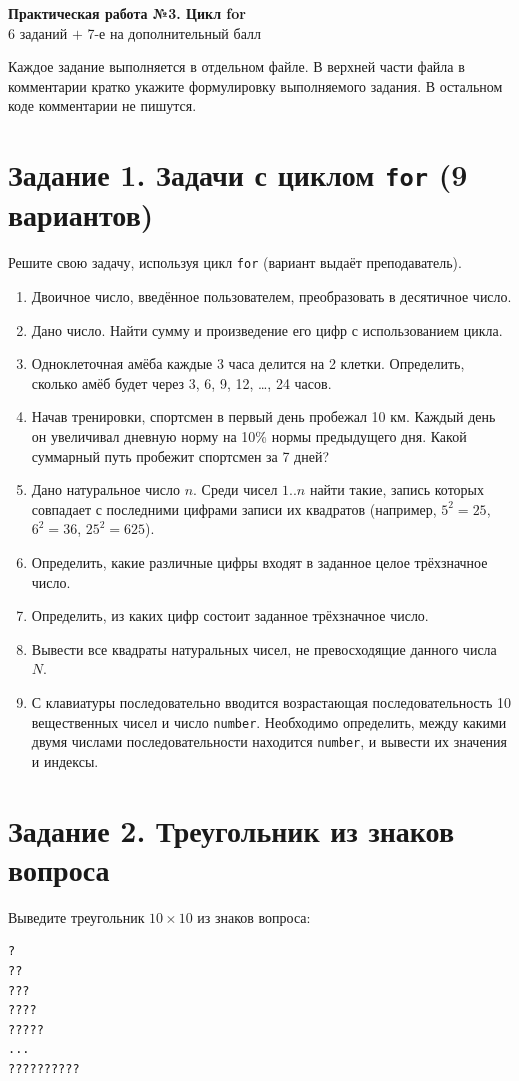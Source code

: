 \documentclass[a4paper,12pt]{article}
\begin{document}
\begin{center}
{\Large\bfseries Практическая работа №3. Цикл for}\\[4pt]
6 заданий $+$ 7-е на дополнительный балл
\end{center}

\medskip
Каждое задание выполняется в отдельном файле. В верхней части файла в комментарии
кратко укажите формулировку выполняемого задания. В остальном коде комментарии не пишутся.

\section*{Задание 1. Задачи с циклом \texttt{for} (9 вариантов)}
Решите свою задачу, используя цикл \texttt{for} (вариант выдаёт преподаватель).
\begin{enumerate}
  \item Двоичное число, введённое пользователем, преобразовать в десятичное число.
  \item Дано число. Найти сумму и произведение его цифр с использованием цикла.
  \item Одноклеточная амёба каждые 3 часа делится на 2 клетки. Определить,
        сколько амёб будет через 3, 6, 9, 12, \dots, 24 часов.
  \item Начав тренировки, спортсмен в первый день пробежал 10 км. Каждый день он
        увеличивал дневную норму на 10\% нормы предыдущего дня. Какой суммарный
        путь пробежит спортсмен за 7 дней?
  \item Дано натуральное число $n$. Среди чисел $1..n$ найти такие, запись которых
        совпадает с последними цифрами записи их квадратов
        (например, $5^2 = 25$, $6^2 = 36$, $25^2 = 625$).
  \item Определить, какие различные цифры входят в заданное целое трёхзначное число.
  \item Определить, из каких цифр состоит заданное трёхзначное число.
  \item Вывести все квадраты натуральных чисел, не превосходящие данного числа $N$.
  \item С клавиатуры последовательно вводится возрастающая последовательность
        10 вещественных чисел и число \texttt{number}. Необходимо определить, между
        какими двумя числами последовательности находится \texttt{number}, и вывести
        их значения и индексы.
\end{enumerate}

\section*{Задание 2. Треугольник из знаков вопроса}
Выведите треугольник $10 \times 10$ из знаков вопроса:
\begin{verbatim}
?
??
???
????
?????
...
??????????
\end{verbatim}
\end{document}
